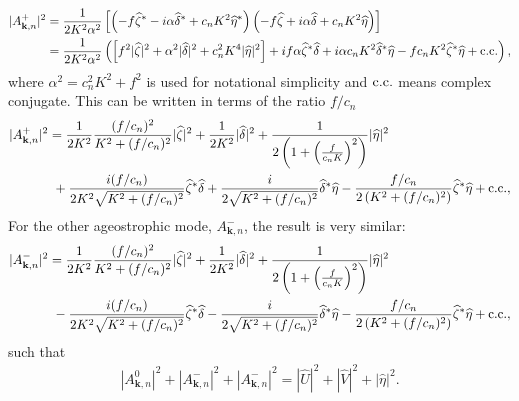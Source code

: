 \begin{align}
|A^+_{\mathbf{k},n}|^2 & = \frac{1}{2K^2 \alpha^2} \left[\left( -f \widehat{\zeta}^* - i\alpha \widehat{\delta}^* + c_n K^2 \widehat{\eta}^* \right)\left( -f \widehat{\zeta} + i\alpha\widehat{\delta} + c_n K^2 \widehat{\eta}\right)\right]\\
&= \frac{1}{2K^2\alpha^2} \left ( \left[f^2 |\widehat{\zeta}|^2 + \alpha^2 |\widehat{\delta}|^2 + c^2_n K^4 |\widehat{\eta}|^2\right] + if\alpha \widehat{\zeta}^* \widehat{\delta} + i \alpha c_n K^2 \widehat{\delta}^* \widehat{\eta} - f c_n K^2 \widehat{\zeta}^* \widehat{\eta} + \hbox{c.c.} \right),
\end{align}
where $\alpha^2 = c^2_nK^2 + f^2$ is used for notational simplicity and $\hbox{c.c.}$ means complex conjugate. This can be written in terms of the ratio $f/c_n$ 
\begin{align}
\begin{split}
|A^+_{\mathbf{k},n}|^2  &= \frac{1}{2K^2} \frac{ (f/c_n)^2}{K^2 + (f/c_n)^2} |\widehat{\zeta}|^2 + \frac{1}{2K^2} |\widehat{\delta}|^2 + \frac{1}{2\left(1 + \left(\frac{f}{c_nK}\right)^2\right)} |\widehat{\eta}|^2\\
&~+ \frac{i(f/c_n)}{2K^2 \sqrt{K^2  + (f/c_n)^2}} \widehat{\zeta}^* \widehat{\delta} + \frac{i}{2\sqrt{K^2 + (f/c_n)^2}} \widehat{\delta}^* \widehat{\eta} - \frac{f/c_n}{2\left(K^2 + (f/c_n)^2 \right)} \widehat{\zeta}^* \widehat{\eta} + \hbox{c.c.}, \label{eq:ageoPlusBreakdown}
\end{split}
\end{align}
For the other ageostrophic mode, $A^-_{\mathbf{k},n}$, the result is very similar:
\begin{align}
\begin{split}
|A^-_{\mathbf{k},n}|^2  &= \frac{1}{2K^2} \frac{ (f/c_n)^2}{K^2 + (f/c_n)^2} |\widehat{\zeta}|^2 + \frac{1}{2K^2} |\widehat{\delta}|^2 + \frac{1}{2\left(1 + \left(\frac{f}{c_nK}\right)^2\right)} |\widehat{\eta}|^2\\
&~- \frac{i(f/c_n)}{2K^2 \sqrt{K^2  + (f/c_n)^2}} \widehat{\zeta}^* \widehat{\delta} - \frac{i}{2\sqrt{K^2 + (f/c_n)^2}} \widehat{\delta}^* \widehat{\eta} - \frac{f/c_n}{2\left(K^2 + (f/c_n)^2 \right)} \widehat{\zeta}^* \widehat{\eta} + \hbox{c.c.}, \label{eq:ageoMinusBreakdown}
\end{split}
\end{align}
such that 
\begin{align}
|A^0_{\mathbf{k},n}|^2 + |A^-_{\mathbf{k},n}|^2 + |A^-_{\mathbf{k},n}|^2 = |\widehat{U}|^2 + |\widehat{V}|^2 + |\widehat{\eta}|^2.
\end{align}

